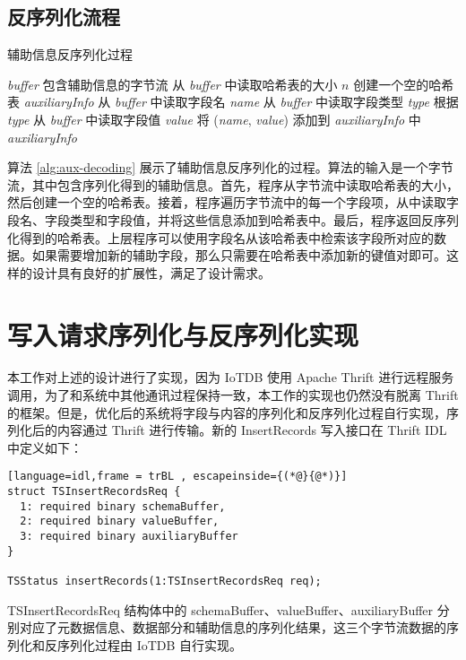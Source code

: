 \subsection{反序列化流程}
\begin{algorithm}
  \caption{辅助信息反序列化过程}
  \label{alg:aux-decoding}
  \small
  \begin{algorithmic}
    \REQUIRE \emph{buffer} 包含辅助信息的字节流
    \STATE 从 \emph{buffer} 中读取哈希表的大小 $n$
    \STATE 创建一个空的哈希表 \emph{auxiliaryInfo}
      \STATE 从 \emph{buffer} 中读取字段名 \emph{name}
      \STATE 从 \emph{buffer} 中读取字段类型 \emph{type}
      \STATE 根据 \emph{type} 从 \emph{buffer} 中读取字段值 \emph{value}
      \STATE 将 (\emph{name}, \emph{value}) 添加到 \emph{auxiliaryInfo} 中
    \ENDFOR
    \RETURN \emph{auxiliaryInfo}
  \end{algorithmic}
\end{algorithm}

算法 \ref{alg:aux-decoding} 展示了辅助信息反序列化的过程。算法的输入是一个字节流，其中包含序列化得到的辅助信息。首先，程序从字节流中读取哈希表的大小，然后创建一个空的哈希表。接着，程序遍历字节流中的每一个字段项，从中读取字段名、字段类型和字段值，并将这些信息添加到哈希表中。最后，程序返回反序列化得到的哈希表。上层程序可以使用字段名从该哈希表中检索该字段所对应的数据。如果需要增加新的辅助字段，那么只需要在哈希表中添加新的键值对即可。这样的设计具有良好的扩展性，满足了设计需求。

\section{写入请求序列化与反序列化实现}
本工作对上述的设计进行了实现，因为 IoTDB 使用 Apache Thrift 进行远程服务调用，为了和系统中其他通讯过程保持一致，本工作的实现也仍然没有脱离 Thrift 的框架。但是，优化后的系统将字段与内容的序列化和反序列化过程自行实现，序列化后的内容通过 Thrift 进行传输。新的 InsertRecords 写入接口在 Thrift IDL 中定义如下：
\begin{lstlisting}[language=idl,frame = trBL , escapeinside={(*@}{@*)}]
struct TSInsertRecordsReq {
  1: required binary schemaBuffer,
  2: required binary valueBuffer,
  3: required binary auxiliaryBuffer
}
  
TSStatus insertRecords(1:TSInsertRecordsReq req);
\end{lstlisting}
TSInsertRecordsReq 结构体中的 schemaBuffer、valueBuffer、auxiliaryBuffer 分别对应了元数据信息、数据部分和辅助信息的序列化结果，这三个字节流数据的序列化和反序列化过程由 IoTDB 自行实现。

